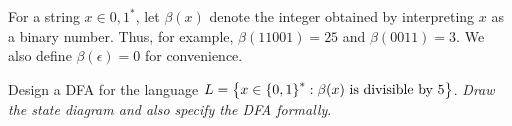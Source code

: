 \begin{problem}
  For a string $x \in {0, 1}^*$, let $\beta(x)$ denote the integer obtained
  by interpreting $x$ as a binary number.
  Thus, for example, $\beta(11001) = 25$ and $\beta(0011) = 3$.
  We also define $\beta(\epsilon) = 0$ for convenience.
  
  \noindent
  Design a DFA for the language $L = \left\{ x \in \left\{0, 1\right\}^* : \beta(x) \text{ is divisible by } 5\right\}$.
  \emph{Draw the state diagram and also specify the DFA formally}.

  \step
\end{problem}
